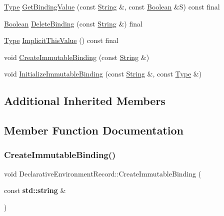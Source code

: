 \begin{DoxyCompactItemize}
\item 
\hyperlink{class_type}{Type} \hyperlink{struct_declarative_environment_record_a886564d5370eb7b2b48a5616c4d1d33a}{Get\+Binding\+Value} (const \hyperlink{struct_string}{String} \&, const \hyperlink{struct_boolean}{Boolean} \&S) const final
\item 
\hyperlink{struct_boolean}{Boolean} \hyperlink{struct_declarative_environment_record_a853cee614241af5f32d9d3cb11d7e6d6}{Delete\+Binding} (const \hyperlink{struct_string}{String} \&) final
\item 
\hyperlink{class_type}{Type} \hyperlink{struct_declarative_environment_record_aafb5da7123366dd48562e07fd393af2d}{Implicit\+This\+Value} () const final
\item 
void \hyperlink{struct_declarative_environment_record_aeab8fc1f5c756454e5c036889b9609ef}{Create\+Immutable\+Binding} (const \hyperlink{struct_string}{String} \&)
\item 
void \hyperlink{struct_declarative_environment_record_ae2d908d84c12f6155dcb174a38bb7277}{Initialize\+Immutable\+Binding} (const \hyperlink{struct_string}{String} \&, const \hyperlink{class_type}{Type} \&)
\end{DoxyCompactItemize}
\subsection*{Additional Inherited Members}


\subsection{Member Function Documentation}
\mbox{\label{struct_declarative_environment_record_a535362f458fd17e07740cfb066fff385}} 
\subsubsection{\texorpdfstring{Create\+Immutable\+Binding()}{CreateImmutableBinding()}\hspace{0.1cm}{\footnotesize\ttfamily [1/2]}}
{\footnotesize\ttfamily void Declarative\+Environment\+Record\+::\+Create\+Immutable\+Binding (\begin{DoxyParamCaption}\item[{const \textbf{ std\+::string} \&}]{ }\end{DoxyParamCaption})}

